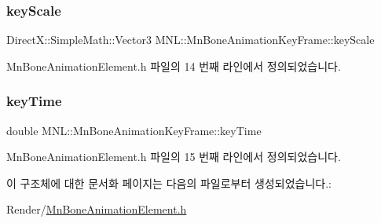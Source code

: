 \subsubsection{\texorpdfstring{key\+Scale}{keyScale}}
{\footnotesize\ttfamily Direct\+X\+::\+Simple\+Math\+::\+Vector3 M\+N\+L\+::\+Mn\+Bone\+Animation\+Key\+Frame\+::key\+Scale}



Mn\+Bone\+Animation\+Element.\+h 파일의 14 번째 라인에서 정의되었습니다.

\mbox{\label{struct_m_n_l_1_1_mn_bone_animation_key_frame_add992780bbdd3b047486ded8c0f8c953}} 
\subsubsection{\texorpdfstring{key\+Time}{keyTime}}
{\footnotesize\ttfamily double M\+N\+L\+::\+Mn\+Bone\+Animation\+Key\+Frame\+::key\+Time}



Mn\+Bone\+Animation\+Element.\+h 파일의 15 번째 라인에서 정의되었습니다.



이 구조체에 대한 문서화 페이지는 다음의 파일로부터 생성되었습니다.\+:\begin{DoxyCompactItemize}
\item 
Render/\hyperlink{_mn_bone_animation_element_8h}{Mn\+Bone\+Animation\+Element.\+h}\end{DoxyCompactItemize}
